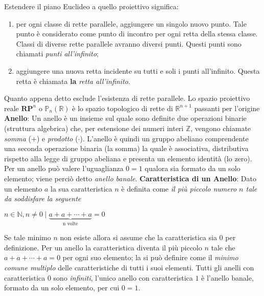 \documentclass[a4paper,12pt]{tesiinfo}
\begin{document}
Estendere il piano Euclideo a quello proiettivo significa:
\begin{enumerate}
    \item per ogni classe di rette parallele, aggiungere un singolo nuovo punto. Tale punto \`e considerato come punto di incontro per ogni retta della stessa classe. Classi di diverse rette parallele avranno diversi punti. Questi punti sono chiamati \textit{punti all'infinito};
    \item aggiungere una nuova retta incidente su tutti e soli i punti all'infinito. Questa retta \`e chiamata \textbf{la} \textit{retta all'infinito}.
\end{enumerate}
Quanto appena detto esclude l'esistenza di rette parallele.\newline
Lo spazio proiettivo reale $\textbf{RP}^n$ o $\mathbb{P}_n(\mathbb{R})$ \`e lo spazio topologico di rette di $\mathbb{R}^ {n+1}$ passanti per l'origine
\newline\newline
\textbf{Anello}: Un anello \`e un insieme sul quale sono definite due operazioni binarie (struttura algebrica) che, per estensione dei numeri interi $\mathbb{Z}$, vengono chiamate \textit{somma} ($+$) e \textit{prodotto} ($\cdot$). L'anello \`e quindi un gruppo abeliano comprendente una seconda operazione binaria (la somma) la quale \`e associativa, distributiva rispetto alla legge di gruppo abeliana e presenta un elemento identit\`a (lo zero).
\newline
Per un anello pu\`o valere l'uguaglianza $0 = 1$ qualora sia formato da un solo elemento; viene perci\`o detto \textit{anello banale}.
\newline\newline
\textbf{Caratteristica di un Anello}: Dato un elemento $a$ la sua caratteristica $n$ \`e definita come \textit{il pi\`u piccolo numero $n$ tale da soddisfare la seguente}
\begin{center}
$n  \in \mathbb{N}, n \ne 0 \mid \underbrace{a+a+\cdots+a}_\text{n volte} {{=}} 0$
\end{center}
Se tale minimo $n$ non esiste allora si assume che la caratteristica sia 0 per definizione.
Per un anello la caratteristica diventa il pi\`u piccolo $n$ tale che $a+a+\cdots+a{{=}}0$ per ogni suo elemento; la si pu\`o definire come il \textit{minimo comune multiplo} delle caratteristiche di tutti i suoi elementi. 
Tutti gli anelli con caratteristica $0$ sono \textit{infiniti}, l'unico anello con caratteristica $1$ \`e l'anello banale, formato da un solo elemento, per cui $0 {{=}} 1$.
\end{document}
